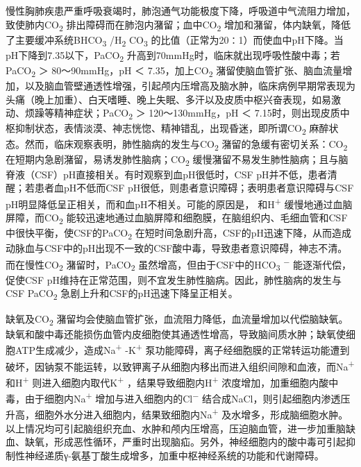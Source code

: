慢性胸肺疾患严重呼吸衰竭时，肺泡通气功能极度下降，呼吸道中气流阻力增加，致使肺内CO\textsubscript{2}
排出障碍而在肺泡内潴留；血中CO\textsubscript{2}
增加和潴留，体内缺氧，降低了主要缓冲系统BHCO\textsubscript{3}
/H\textsubscript{2} CO\textsubscript{3}
的比值（正常为20∶1）而使血中pH下降。当pH下降到7.35以下，PaCO\textsubscript{2}
升高到70mmHg时，临床就出现呼吸性酸中毒；若PaCO\textsubscript{2} ＞
80～90mmHg，pH ＜ 7.35，加上CO\textsubscript{2}
潴留使脑血管扩张、脑血流量增加，以及脑血管壁通透性增强，引起颅内压增高及脑水肿，临床病例早期常表现为头痛（晚上加重）、白天嗜睡、晚上失眠、多汗以及皮质中枢兴奋表现，如易激动、烦躁等精神症状；PaCO\textsubscript{2}
＞ 120～130mmHg，pH ＜
7.15时，则出现皮质中枢抑制状态，表情淡漠、神志恍惚、精神错乱，出现昏迷，即所谓CO\textsubscript{2}
麻醉状态。然而，临床观察表明，肺性脑病的发生与CO\textsubscript{2}
潴留的急缓有密切关系：CO\textsubscript{2}
在短期内急剧潴留，易诱发肺性脑病；CO\textsubscript{2}
缓慢潴留不易发生肺性脑病；且与脑脊液（CSF）pH直接相关。有时观察到血pH很低时，CSF
pH并不低，患者清醒；若患者血pH不低而CSF
pH很低，则患者意识障碍；表明患者意识障碍与CSF
pH明显降低呈正相关，而和血pH不相关。可能的原因是，{}
和H\textsuperscript{+} 缓慢地通过血脑屏障，而CO\textsubscript{2}
能较迅速地通过血脑屏障和细胞膜，在脑组织内、毛细血管和CSF中很快平衡，使CSF的PaCO\textsubscript{2}
在短时间急剧升高，CSF的pH迅速下降，从而造成动脉血与CSF中的pH出现不一致的CSF酸中毒，导致患者意识障碍，神志不清。而在慢性CO\textsubscript{2}
潴留时，PaCO\textsubscript{2}
虽然增高，但由于CSF中的HCO\textsubscript{3} \textsuperscript{−}
能逐渐代偿，促使CSF
pH维持在正常范围，则不宜发生肺性脑病。因此，肺性脑病的发生与CSF
PaCO\textsubscript{2} 急剧上升和CSF的pH迅速下降呈正相关。

缺氧及CO\textsubscript{2}
潴留均会使脑血管扩张，血流阻力降低，血流量增加以代偿脑缺氧。缺氧和酸中毒还能损伤血管内皮细胞使其通透性增高，导致脑间质水肿；缺氧使细胞ATP生成减少，造成Na\textsuperscript{+}
-K\textsuperscript{+}
泵功能障碍，离子经细胞膜的正常转运功能遭到破坏，因钠泵不能运转，以致钾离子从细胞内移出而进入组织间隙和血液，而Na\textsuperscript{+}
和H\textsuperscript{+} 则进入细胞内取代K\textsuperscript{+}
，结果导致细胞内H\textsuperscript{+}
浓度增加，加重细胞内酸中毒，由于细胞内Na\textsuperscript{+}
增加与进入细胞内的Cl\textsuperscript{−}
结合成NaCl，则引起细胞内渗透压升高，细胞外水分进入细胞内，结果致细胞内Na\textsuperscript{+}
及水增多，形成脑细胞水肿。以上情况均可引起脑组织充血、水肿和颅内压增高，压迫脑血管，进一步加重脑缺血、缺氧，形成恶性循环，严重时出现脑疝。另外，神经细胞内的酸中毒可引起抑制性神经递质γ-氨基丁酸生成增多，加重中枢神经系统的功能和代谢障碍。

